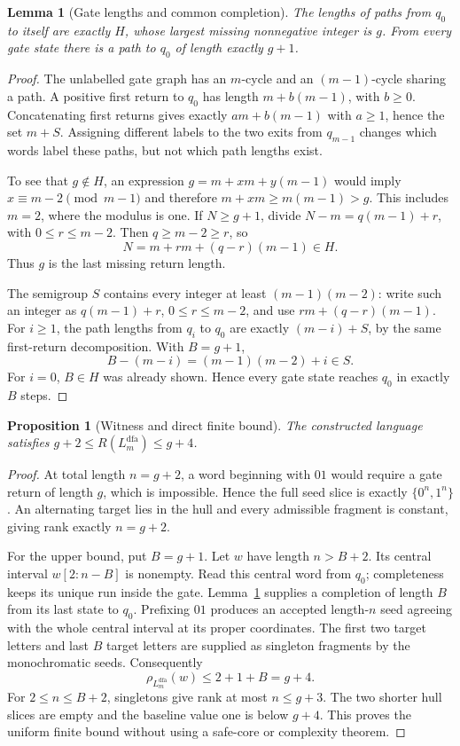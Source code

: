 \documentclass[11pt,letterpaper]{article}
\newtheorem{lemma}[theorem]{Lemma}
\newtheorem{proposition}[theorem]{Proposition}
\theoremstyle{definition}
\theoremstyle{remark}
\newcommand{\rank}{\rho}
\newcommand{\Ldfa}[1]{L^{\mathrm{dfa}}_{#1}}
\begin{document}
\begin{lemma}[Gate lengths and common completion]\label{ccc:dc:lem:gate}
The lengths of paths from $q_0$ to itself are exactly $H$, whose largest missing nonnegative integer is $g$. From every gate state there is a path to $q_0$ of length exactly $g+1$.
\end{lemma}
\begin{proof}
The unlabelled gate graph has an $m$-cycle and an $(m-1)$-cycle sharing a path. A positive first return to $q_0$ has length $m+b(m-1)$, with $b\ge0$. Concatenating first returns gives exactly $am+b(m-1)$ with $a\ge1$, hence the set $m+S$. Assigning different labels to the two exits from $q_{m-1}$ changes which words label these paths, but not which path lengths exist.

To see that $g\notin H$, an expression $g=m+xm+y(m-1)$ would imply $x\equiv m-2\pmod{m-1}$ and therefore $m+xm\ge m(m-1)>g$. This includes $m=2$, where the modulus is one. If $N\ge g+1$, divide $N-m=q(m-1)+r$, with $0\le r\le m-2$. Then $q\ge m-2\ge r$, so
\[
N=m+rm+(q-r)(m-1)\in H.
\]
Thus $g$ is the last missing return length.

The semigroup $S$ contains every integer at least $(m-1)(m-2)$: write such an integer as $q(m-1)+r$, $0\le r\le m-2$, and use $rm+(q-r)(m-1)$. For $i\ge1$, the path lengths from $q_i$ to $q_0$ are exactly $(m-i)+S$, by the same first-return decomposition. With $B=g+1$,
\[
B-(m-i)=(m-1)(m-2)+i\in S.
\]
For $i=0$, $B\in H$ was already shown. Hence every gate state reaches $q_0$ in exactly $B$ steps.
\end{proof}

\begin{proposition}[Witness and direct finite bound]\label{ccc:dc:prop:family}
The constructed language satisfies $g+2\le R(\Ldfa m)\le g+4$.
\end{proposition}
\begin{proof}
At total length $n=g+2$, a word beginning with $01$ would require a gate return of length $g$, which is impossible. Hence the full seed slice is exactly $\{0^n,1^n\}$. An alternating target lies in the hull and every admissible fragment is constant, giving rank exactly $n=g+2$.

For the upper bound, put $B=g+1$. Let $w$ have length $n>B+2$. Its central interval $w[2:n-B]$ is nonempty. Read this central word from $q_0$; completeness keeps its unique run inside the gate. Lemma~\ref{ccc:dc:lem:gate} supplies a completion of length $B$ from its last state to $q_0$. Prefixing $01$ produces an accepted length-$n$ seed agreeing with the whole central interval at its proper coordinates. The first two target letters and last $B$ target letters are supplied as singleton fragments by the monochromatic seeds. Consequently
\[
\rank_{\Ldfa m}(w)\le2+1+B=g+4.
\]
For $2\le n\le B+2$, singletons give rank at most $n\le g+3$. The two shorter hull slices are empty and the baseline value one is below $g+4$. This proves the uniform finite bound without using a safe-core or complexity theorem.
\end{proof}
\end{document}
